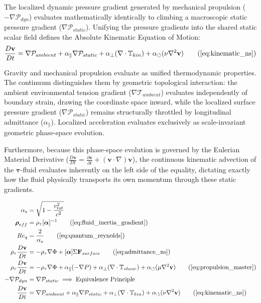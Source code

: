 \documentclass[11pt, a4paper]{article}
\begin{document}
The localized dynamic pressure gradient generated by mechanical propulsion ($-\nabla \mathcal{P}_{dyn}$) evaluates mathematically identically to climbing a macroscopic static pressure gradient ($\nabla \mathcal{P}_{static}$). Unifying the pressure gradients into the shared static scalar field defines the Absolute Kinematic Equation of Motion:
\begin{equation}
    \frac{D\mathbf{v}}{Dt} = \nabla \mathcal{P}_{ambient} + \alpha_{\parallel}\nabla \mathcal{P}_{static} + \alpha_{\perp}(\nabla \cdot \mathbb{T}_{kin}) + \alpha_{\circlearrowleft}(\nu \nabla^2 \mathbf{v}) \tag{\ref{eq:kinematic_ns}}
\end{equation}

Gravity and mechanical propulsion evaluate as unified thermodynamic properties. The continuum distinguishes them   by geometric topological interaction: the ambient environmental tension gradient ($\nabla \mathcal{T}_{ambient}$) evaluates independently of boundary strain, drawing the coordinate space inward, while the localized surface pressure gradient ($\nabla \mathcal{P}_{static}$) remains structurally throttled by longitudinal admittance ($\alpha_{\parallel}$). Localized acceleration evaluates exclusively as scale-invariant geometric phase-space evolution. 

Furthermore, because this phase-space evolution is governed by the Eulerian Material Derivative ($\frac{D\mathbf{v}}{Dt} = \frac{\partial \mathbf{v}}{\partial t} + (\mathbf{v} \cdot \nabla)\mathbf{v}$), the continuous kinematic advection of the $\boldsymbol{\tau}$-fluid evaluates inherently on the left side of the equality, dictating exactly how the fluid physically transports its own momentum through these static gradients.

\begin{tcolorbox}[recallbox, title={\ref{box:admittance_ns}. Admittance-Modified Navier-Stokes}]
\begin{align}
    \alpha_s &= \sqrt{1 - \frac{v_{tot}^2}{c^2}} \nonumber \\
    \boldsymbol{\rho}_{eff} &= \rho_{\tau} [\boldsymbol{\alpha}]^{-1} \tag{\ref{eq:fluid_inertia_gradient}} \\
    Re_q &= \frac{2}{\alpha_s} \tag{\ref{eq:quantum_reynolds}} \\
    \rho_{\tau} \frac{D\mathbf{v}}{Dt} &= -\rho_{\tau} \nabla \Phi + [\boldsymbol{\alpha}] \Sigma \mathbf{F}_{surface} \tag{\ref{eq:admittance_ns}} \\
    \rho_{\tau} \frac{D\mathbf{v}}{Dt} &= -\rho_{\tau} \nabla \Phi + \alpha_{\parallel}(-\nabla P) + \alpha_{\perp}(\nabla \cdot \mathbb{T}_{shear}) + \alpha_{\circlearrowleft}(\mu \nabla^2 \mathbf{v}) \tag{\ref{eq:propulsion_master}} \\
    -\nabla \mathcal{P}_{dyn} &= \nabla \mathcal{P}_{static} \implies \text{Equivalence Principle} \nonumber \\
    \frac{D\mathbf{v}}{Dt} &= \nabla \mathcal{P}_{ambient} + \alpha_{\parallel}\nabla \mathcal{P}_{static} + \alpha_{\perp}(\nabla \cdot \mathbb{T}_{kin}) + \alpha_{\circlearrowleft}(\nu \nabla^2 \mathbf{v}) \tag{\ref{eq:kinematic_ns}}
\end{align}
\end{tcolorbox}
\end{document}
